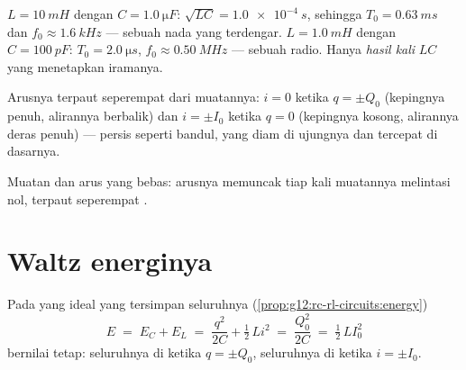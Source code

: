 \begin{example}\label{ex:g12:rlc-oscillations:firstnumbers}
$L = \qty{10}{mH}$ dengan $C = \qty{1.0}{\micro F}$:
$\sqrt{LC} = \qty{1.0e-4}{s}$, sehingga $T_0 = \qty{0.63}{ms}$ dan
$f_0 \approx \qty{1.6}{kHz}$ --- sebuah nada yang terdengar. $L = \qty{1.0}{mH}$
dengan $C = \qty{100}{pF}$: $T_0 = \qty{2.0}{\micro s}$,
$f_0 \approx \qty{0.50}{MHz}$ --- sebuah  radio. Hanya
\emph{hasil kali} $LC$ yang menetapkan iramanya.
\end{example}

\begin{remark}\label{rem:g12:rlc-oscillations:quarter}
Arusnya terpaut seperempat   dari muatannya: $i = 0$
ketika $q = \pm Q_0$ (kepingnya penuh, alirannya berbalik) dan $i = \pm I_0$
ketika $q = 0$ (kepingnya kosong, alirannya deras penuh) --- persis seperti
bandul, yang diam di ujungnya dan tercepat di dasarnya.
\end{remark}

\begin{omfigure}

{\small Muatan dan arus  yang bebas: arusnya memuncak
tiap kali muatannya melintasi nol, terpaut seperempat .}
\end{omfigure}

\section{Waltz energinya}

\begin{proposition}\label{prop:g12:rlc-oscillations:energy}
Pada  yang ideal  yang tersimpan seluruhnya
(\cref{prop:g12:rc-rl-circuits:energy})
\[
E \;=\; E_C + E_L \;=\; \frac{q^2}{2C} + \tfrac12\,L i^2
\;=\; \frac{Q_0^2}{2C} \;=\; \tfrac12\,L I_0^2
\]
bernilai tetap: seluruhnya di  ketika $q = \pm Q_0$, seluruhnya di
 ketika $i = \pm I_0$.
\end{proposition}

